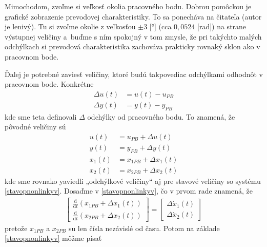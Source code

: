 \documentclass[a4paper, 10pt, ]{article}
\begin{document}
\bigskip

Mimochodom, zvoľme si veľkosť okolia pracovného bodu. Dobrou pomôckou je grafické zobrazenie prevodovej charakteristiky. To sa ponecháva na čitateľa (autor je lenivý). Tu si zvoľme okolie z veľkosťou $\pm 3$ [°] (cca $0,0524$ [rad]) na strane výstupnej veličiny a~buďme s ním spokojný v tom zmysle, že pri takýchto malých odchýlkach si prevodová charakteristika zachováva prakticky rovnaký sklon ako v pracovnom bode.

\bigskip

Ďalej je potrebné zaviesť veličiny, ktoré budú takpovediac odchýlkami odhodnôt v pracovnom bode. Konkrétne
\begin{subequations}
    \begin{align}
        \Delta u(t) &= u(t) - u_{PB} \\
        \Delta y(t) &= y(t) - y_{PB}
    \end{align}
\end{subequations}
kde sme teta definovali $\Delta$ odchýlky od pracovného bodu. To znamená, že pôvodné veličiny sú
\begin{subequations}
    \begin{align}
        u(t)  &=  u_{PB} + \Delta u(t) \\
        y(t)  &=  y_{PB} + \Delta y(t) \\
        x_1(t)  &=  x_{1PB} + \Delta x_1(t) \\
        x_2(t)  &=  x_{2PB} + \Delta x_2(t)
    \end{align}
\end{subequations}
kde sme rovnako yaviedli „odchýlkové veličiny“ aj pre stavové veličiny so systému \eqref{stavopnonlinkyv}. Dosaďme v \eqref{stavopnonlinkyv}, čo v prvom rade znamená, že
	\begin{align}
		\begin{bmatrix}
			\frac{\text{d}}{\text{d}t} \left( x_{1PB} + \Delta x_1(t) \right)   \\
            \frac{\text{d}}{\text{d}t} \left( x_{2PB} + \Delta x_2(t) \right)
		\end{bmatrix}
        =
        \begin{bmatrix}
			 \Delta \dot x_1(t)    \\
             \Delta \dot x_2(t)
		\end{bmatrix}
	\end{align}
pretože $x_{1PB}$ a $x_{2PB}$ su len čísla nezávislé od času. Potom na základe \eqref{stavopnonlinkyv} môžme písať
\end{document}
